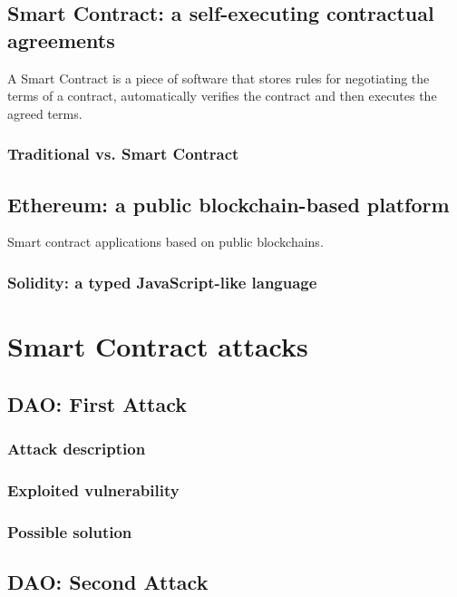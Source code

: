 \subsection{Smart Contract: a self-executing contractual agreements}
A Smart Contract is a piece of software that stores rules for negotiating the terms of a contract, automatically verifies the contract and then executes the agreed terms. 

\subsubsection{Traditional vs. Smart Contract}

\subsection{Ethereum: a public blockchain-based platform}
Smart contract applications based on public blockchains.


\subsubsection{Solidity: a typed JavaScript-like language}


\section{Smart Contract attacks}

\subsection{DAO: First Attack}
\subsubsection{Attack description}
\subsubsection{Exploited vulnerability}
\subsubsection{Possible solution}

\subsection{DAO: Second Attack}
